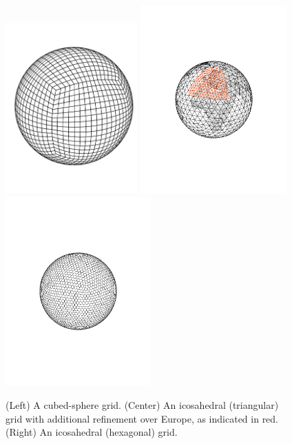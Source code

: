 \documentclass[gmd, manuscript]{copernicus}
\begin{document}
\begin{figure}
\begin{center}
\includegraphics[width=2in,trim={0cm 4.7cm 0cm 4cm},clip]{CubedSphereMesh.pdf} \quad \includegraphics[width=2.2in, trim={4cm 8.2cm 4cm 8.2cm},clip]{ICON_grid_nested_schematic.pdf} \quad \includegraphics[width=2.2in, trim={4cm 8.2cm 4cm 8.2cm},clip]{ICON_grid_dual_R2B3_noWorldMap.pdf}
\end{center}
\caption{(Left) A cubed-sphere grid.  (Center) An icosahedral (triangular) grid with additional refinement over Europe, as indicated in red.  (Right) An icosahedral (hexagonal) grid.} \label{fig:CubedSphereGeodesicMesh}
\end{figure}
\end{document}
